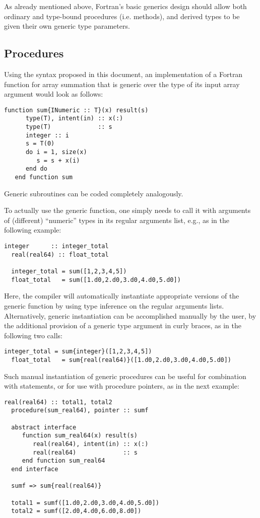 \documentclass[11pt,oneside]{report}
\newcommand{\code}[1]{{\selectfont\ttfamily{#1}}}
\begin{document}
As already mentioned above, Fortran's basic generics design should
allow both ordinary and type-bound procedures (i.e. methods), and
derived types to be given their own generic type parameters.

\subsection{Procedures}
\label{sect:generic_procedures}

Using the syntax proposed in this document, an implementation of a
Fortran function for array summation that is generic over the type of its
input array argument would look as follows:
\begin{lstlisting}[language=LFortran,style=boxed]
   function sum{INumeric :: T}(x) result(s)
      type(T), intent(in) :: x(:)
      type(T)             :: s
      integer :: i
      s = T(0)
      do i = 1, size(x)
         s = s + x(i)
      end do
   end function sum
\end{lstlisting}
Generic subroutines can be coded completely analogously.

To actually use the \code{sum} generic function, one simply needs to
call it with arguments of (different) ``numeric'' types in its
regular arguments list, e.g., as in the following example:
\begin{lstlisting}[language=LFortran,style=boxed]
  integer      :: integer_total
  real(real64) :: float_total
  
  integer_total = sum([1,2,3,4,5])
  float_total   = sum([1.d0,2.d0,3.d0,4.d0,5.d0])
\end{lstlisting}
Here, the compiler will automatically instantiate appropriate versions
of the \code{sum} generic function by using type inference on the
regular arguments lists. Alternatively, generic instantiation can be
accomplished manually by the user, by the additional provision of a
generic type argument in curly braces, as in the following two calls:
\begin{lstlisting}[language=LFortran,style=boxed]
  integer_total = sum{integer}([1,2,3,4,5])
  float_total   = sum{real(real64)}([1.d0,2.d0,3.d0,4.d0,5.d0])
\end{lstlisting}
Such manual instantiation of generic procedures can be useful for
combination with \code{associate} statements, or for use with
procedure pointers, as in the next example:
\begin{lstlisting}[language=LFortran,style=boxed]
  real(real64) :: total1, total2
  procedure(sum_real64), pointer :: sumf

  abstract interface
     function sum_real64(x) result(s)
        real(real64), intent(in) :: x(:)
        real(real64)             :: s
     end function sum_real64  
  end interface
  
  sumf => sum{real(real64)}

  total1 = sumf([1.d0,2.d0,3.d0,4.d0,5.d0])
  total2 = sumf([2.d0,4.d0,6.d0,8.d0])
\end{lstlisting}
\end{document}
